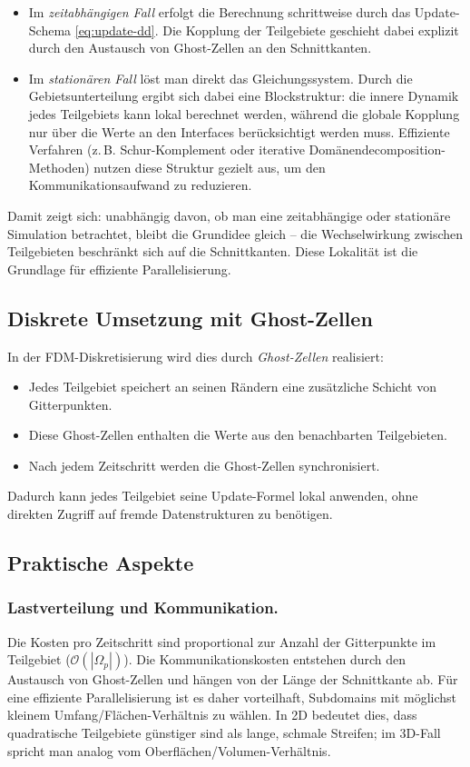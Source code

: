\begin{itemize}
	\item Im \emph{zeitabhängigen Fall} erfolgt die Berechnung schrittweise durch       das Update-Schema 
	\eqref{eq:update-dd}. Die Kopplung der Teilgebiete geschieht dabei explizit durch den 
	Austausch von Ghost-Zellen an den Schnittkanten.  
	
	\item Im \emph{stationären Fall} löst man direkt das Gleichungssystem. 
	Durch die Gebietsunterteilung ergibt sich dabei eine Blockstruktur: 
	die innere Dynamik jedes Teilgebiets kann lokal berechnet werden, 
	während die globale Kopplung nur über die Werte an den Interfaces berücksichtigt werden muss.  
	Effiziente Verfahren (z.\,B. Schur-Komplement oder iterative Domänendecomposition-Methoden) 
	nutzen diese Struktur gezielt aus, um den Kommunikationsaufwand zu reduzieren.
\end{itemize}


\medskip
\noindent
Damit zeigt sich: unabhängig davon, ob man eine zeitabhängige oder stationäre Simulation betrachtet, 
bleibt die Grundidee gleich – die Wechselwirkung zwischen Teilgebieten beschränkt sich auf die Schnittkanten. 
Diese Lokalität ist die Grundlage für effiziente Parallelisierung.

\subsection{Diskrete Umsetzung mit Ghost-Zellen}

In der FDM-Diskretisierung wird dies durch \emph{Ghost-Zellen} realisiert:
\begin{itemize}
	\item Jedes Teilgebiet speichert an seinen Rändern eine zusätzliche Schicht von Gitterpunkten.
	\item Diese Ghost-Zellen enthalten die Werte aus den benachbarten Teilgebieten.
	\item Nach jedem Zeitschritt werden die Ghost-Zellen synchronisiert.
\end{itemize}

Dadurch kann jedes Teilgebiet seine Update-Formel lokal anwenden, ohne direkten Zugriff auf fremde Datenstrukturen zu benötigen.

\subsection{Praktische Aspekte}

\subsubsection {Lastverteilung und Kommunikation.}
Die Kosten pro Zeitschritt sind proportional zur Anzahl der Gitterpunkte im Teilgebiet 
($\mathcal{O}(|\Omega_p|)$).  
Die Kommunikationskosten entstehen durch den Austausch von Ghost-Zellen und hängen von der Länge der Schnittkante ab.  
Für eine effiziente Parallelisierung ist es daher vorteilhaft, Subdomains mit möglichst kleinem 
Umfang/Flächen-Verhältnis zu wählen.  
In 2D bedeutet dies, dass quadratische Teilgebiete günstiger sind als lange, schmale Streifen; 
im 3D-Fall spricht man analog vom Oberflächen/Volumen-Verhältnis.  

